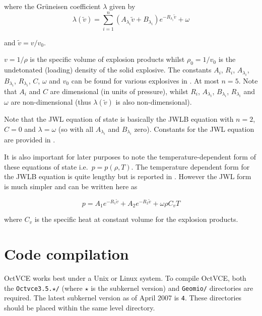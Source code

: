\documentclass[pdftex, 12pt, a4paper]{report}
\begin{document}
where the Gr\"{u}neisen coefficient $\lambda$ given by 
\begin{equation}\label{eq:lambda}
\lambda\left(\widetilde{v}\right) = \sum_{i = 1}^{n}\left(A_{\lambda_{i}}\widetilde{v} + B_{\lambda_{i}} \right)e^{-R_{\lambda_{i}}\widetilde{v}} + \omega
\end{equation}

and $\widetilde{v} = v/v_0$.

$v = 1/\rho$ is the specific volume of explosion products whilst $\rho_0 = 1/v_0$ is the undetonated (loading) density of the 
solid explosive.  The constants $A_{i}$, $R_{i}$, $A_{\lambda_{i}}$, $B_{\lambda_{i}}$, $R_{\lambda_{i}}$, $C$, $\omega$ and $v_0$ can 
be found for various explosives in \cite{Baker:im}.  At most $n = 5$. Note that $A_i$ and $C$ are dimensional (in units of 
pressure), whilst $R_{i}$, $A_{\lambda_{i}}$, $B_{\lambda_{i}}$, $R_{\lambda_{i}}$
and $\omega$ are non-dimensional (thus $\lambda\left(\widetilde{v}\right)$ is also non-dimensional). 

Note that the JWL equation of state is basically the JWLB equation with  
$n = 2$, $C = 0$ and $\lambda = \omega$ (so with all $A_{\lambda_{i}}$ and $B_{\lambda_{i}}$ zero).  Constants for the JWL equation
are provided in \cite{Lee:ae}.

It is also important for later purposes to note the temperature-dependent form of these equations of 
state i.e.\ $p = p\left(\rho, T\right)$.  The temperature dependent form for the JWLB equation is quite lengthy but is
reported in \cite{Baker:io}.  However the JWL form is much simpler and can be written here as

\begin{equation}\label{eq:JWL_T}
  p = A_1e^{-R_1 \widetilde{v}} + A_2e^{-R_2 \widetilde{v}} + \omega \rho C_v T
\end{equation}

where $C_v$ is the specific heat at constant volume for the explosion products.

\chapter{Code compilation}\label{sec:code_compile}

OctVCE works best under a Unix or Linux system.  To compile OctVCE, both the \verb'Octvce3.5.'$\star$\verb'/' (where $\star$ is the 
subkernel version) and  \verb'Geomio/' directories are required.  The latest subkernel version as of April 2007 is \verb'4'.
These directories should be placed within the same level directory.  
\end{document}
